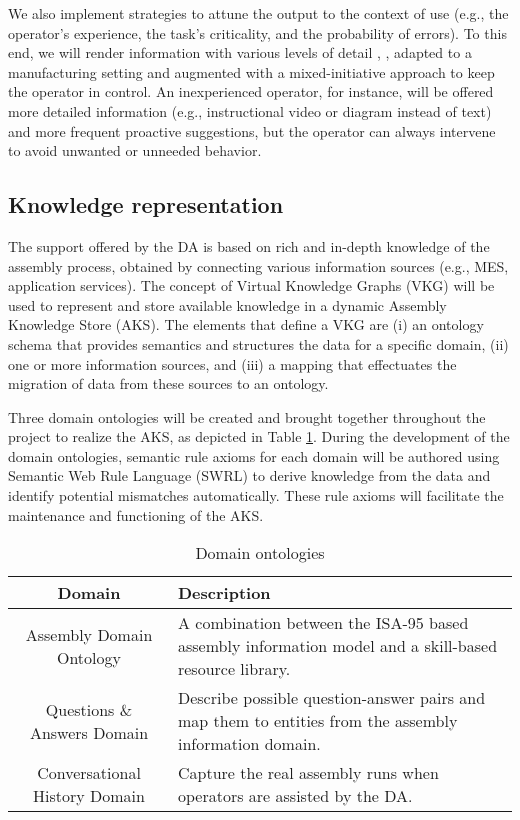 We also implement strategies to attune the output to the context of use (e.g., the operator's experience, the task's criticality, and the probability of errors). To this end, we will render information with various levels of detail \cite{Mezhoudi2015AnAA}, \cite{10.1145/3332165.3347945}, adapted to a manufacturing setting and augmented with a mixed-initiative approach to keep the operator in control. An inexperienced operator, for instance, will be offered more detailed information (e.g., instructional video or diagram instead of text) and more frequent proactive suggestions, but the operator can always intervene to avoid unwanted or unneeded behavior.

\subsection{Knowledge representation}
The support offered by the DA is based on rich and in-depth knowledge of the assembly process, obtained by connecting various information sources (e.g., MES, application services). The concept of Virtual Knowledge Graphs (VKG) \cite{xiao2019VirtualKnowledgeGraphs} will be used to represent and store available knowledge in a dynamic Assembly Knowledge Store (AKS). The elements that define a VKG are (i) an ontology schema that provides semantics and structures the data for a specific domain, (ii) one or more information sources, and (iii) a mapping that effectuates the migration of data from these sources to an ontology. 

Three domain ontologies will be created and brought together throughout the project to realize the AKS, as depicted in Table \ref{tab:ontolgoies}. During the development of the domain ontologies, semantic rule axioms \cite{sormaz2019SIMPMUpperlevelOntology} for each domain will be authored using Semantic Web Rule Language (SWRL) to derive knowledge from the data and identify potential mismatches automatically. These rule axioms will facilitate the maintenance and functioning of the AKS.

\begin{table}
  \caption{Domain ontologies}
  \label{tab:ontolgoies}
  \begin{tabular}{cp{7cm}}
    \toprule
    Domain & Description\\
    \midrule
    Assembly Domain Ontology &  A combination between the ISA-95 based assembly information model \cite{claeys2018OntologicalModelManaging} and a skill-based resource library.\\ 
    Questions \& Answers Domain & Describe possible question-answer pairs and map them to entities from the assembly information domain. \\
    Conversational History Domain & Capture the real assembly runs when operators are assisted by the DA.\\
    \bottomrule
  \end{tabular}
\end{table}

